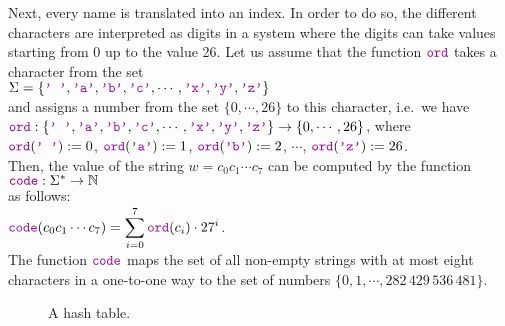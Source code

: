 Next, every name is translated into an index.  In order to do so, the different
characters are interpreted as digits in a system where the digits can take values starting
from 0 up to the value 26.
Let us assume that the function  $\mytt{ord}$ takes a character from the set
\\[0.2cm]
\hspace*{1.3cm}
$\Sigma = \{ \mytt{' '}, \mytt{'a'}, \mytt{'b'}, \mytt{'c'}, \cdots, \mytt{'x'}, \mytt{'y'}, \mytt{'z'} \}$ 
\\[0.2cm]
and assigns a number from the set $\{0,\cdots,26\}$ to this character, i.e.~we have \\[0.2cm]
\hspace*{1.3cm} 
$\mytt{ord}: \{ \mytt{' '}, \mytt{'a'}, \mytt{'b'}, \mytt{'c'}, \cdots, \mytt{'x'}, \mytt{'y'},
\mytt{'z'} \} \rightarrow \{0,\cdots, 26\}$, \quad where
\\[0.2cm]
\hspace*{1.3cm}
$\mytt{ord}(\mytt{' '}) := 0$, \quad
$\mytt{ord}(\mytt{'a'}) := 1$, \quad
$\mytt{ord}(\mytt{'b'}) := 2$, \quad $\cdots$, \quad
$\mytt{ord}(\mytt{'z'}) := 26$.
\\[0.2cm]
Then, the value of the string  $w = c_0c_1\cdots c_7$ can be computed by the function \\[0.2cm]
\hspace*{1.3cm} 
$\mytt{code}: \Sigma^* \rightarrow \mathbb{N}$ \\[0.2cm]
as follows: \\[0.2cm]
\hspace*{1.3cm} 
$\ds \mytt{code}(c_0c_1\cdots c_7) = \sum\limits_{i=0}^7 \mytt{ord}(c_i) \cdot 27^i$.
\\[0.2cm]
The function $\mytt{code}$ maps the set of all non-empty strings with at most eight characters in a
one-to-one way to the set of numbers $\{0,1,\cdots, 282\,429\,536\,481 \}$.


\begin{figure}[!ht]
  \centering
  \caption{A hash table.}
  \label{fig:hash-example}
\end{figure}

